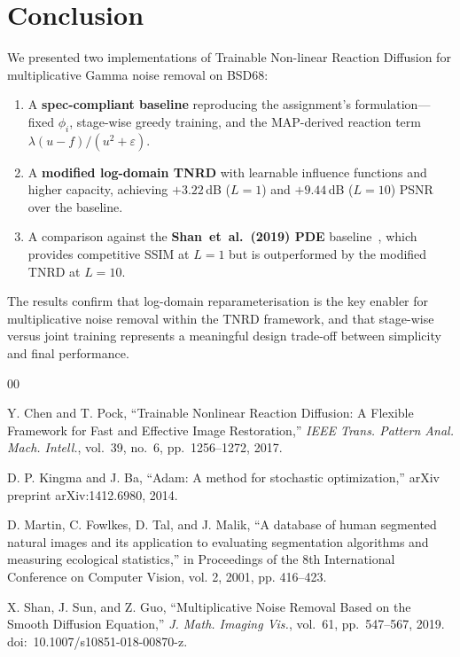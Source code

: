\documentclass[10pt,conference]{IEEEtran}
\begin{document}
\section{Conclusion}

We presented two implementations of Trainable Non-linear Reaction Diffusion
for multiplicative Gamma noise removal on BSD68:

\begin{enumerate}
    \item A \textbf{spec-compliant baseline} reproducing the assignment's
          formulation---fixed $\phi_i$, stage-wise greedy training, and the
          MAP-derived reaction term $\lambda(u{-}f)/(u^2{+}\varepsilon)$.
    \item A \textbf{modified log-domain TNRD} with learnable influence
          functions and higher capacity, achieving $+3.22$\,dB ($L{=}1$) and
          $+9.44$\,dB ($L{=}10$) PSNR over the baseline.
    \item A comparison against the \textbf{Shan~et~al.\ (2019) PDE}
          baseline~\cite{shan2019}, which provides competitive SSIM at
          $L{=}1$ but is outperformed by the modified TNRD at $L{=}10$.
\end{enumerate}

The results confirm that log-domain reparameterisation is the key enabler for
multiplicative noise removal within the TNRD framework, and that stage-wise
versus joint training represents a meaningful design trade-off between
simplicity and final performance.

\begin{thebibliography}{00}

 Y. Chen and T. Pock, ``Trainable Nonlinear Reaction Diffusion: A Flexible Framework for Fast and Effective Image Restoration,'' \emph{IEEE Trans. Pattern Anal. Mach. Intell.}, vol.~39, no.~6, pp.~1256--1272, 2017.

 D. P. Kingma and J. Ba, ``Adam: A method for stochastic optimization,'' arXiv preprint arXiv:1412.6980, 2014.

 D. Martin, C. Fowlkes, D. Tal, and J. Malik, ``A database of human segmented natural images and its application to evaluating segmentation algorithms and measuring ecological statistics,'' in Proceedings of the 8th International Conference on Computer Vision, vol. 2, 2001, pp. 416--423.

 X. Shan, J. Sun, and Z. Guo, ``Multiplicative Noise Removal Based on the Smooth Diffusion Equation,'' \emph{J. Math. Imaging Vis.}, vol.~61, pp.~547--567, 2019. doi:~10.1007/s10851-018-00870-z.

\end{thebibliography}
\end{document}
